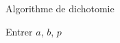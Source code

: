 \documentclass[12pt,french]{report}
\begin{document}
\begin{spacing}{1.2}
\begin{center}
\begin{minipage}{0.45\linewidth}
\begin{mybox}[colback=blue!10]{Algorithme de dichotomie}
\normalem %
\DontPrintSemicolon %
\SetAlgoVlined %

\hspace*{0.5em}\begin{algorithm}[H]
Entrer $a$, $b$, $p$\;
\end{algorithm}
\ULforem %
\end{mybox}
\end{minipage}
\end{center}

\end{spacing}
\end{document}
